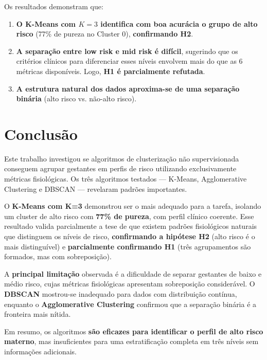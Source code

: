 \documentclass[12pt]{article}
\begin{document}
Os resultados demonstram que:
\begin{enumerate}
    \item \textbf{O K-Means com $K=3$ identifica com boa acurácia o grupo de alto risco} (77\% de pureza no Cluster 0), \textbf{confirmando H2}.
    \item \textbf{A separação entre low risk e mid risk é difícil}, sugerindo que os critérios clínicos para diferenciar esses níveis envolvem mais do que as 6 métricas disponíveis. Logo, \textbf{H1 é parcialmente refutada}.
    \item \textbf{A estrutura natural dos dados aproxima-se de uma separação binária} (alto risco vs. não-alto risco).
\end{enumerate}

\section{Conclusão}

Este trabalho investigou se algoritmos de clusterização não supervisionada conseguem agrupar gestantes em perfis de risco utilizando exclusivamente métricas fisiológicas. Os três algoritmos testados --- K-Means, Agglomerative Clustering e DBSCAN --- revelaram padrões importantes.

O \textbf{K-Means com K=3} demonstrou ser o mais adequado para a tarefa, isolando um cluster de alto risco com \textbf{77\% de pureza}, com perfil clínico coerente. Esse resultado valida parcialmente a tese de que existem padrões fisiológicos naturais que distinguem os níveis de risco, \textbf{confirmando a hipótese H2} (alto risco é o mais distinguível) e \textbf{parcialmente confirmando H1} (três agrupamentos são formados, mas com sobreposição).

A \textbf{principal limitação} observada é a dificuldade de separar gestantes de baixo e médio risco, cujas métricas fisiológicas apresentam sobreposição considerável. O \textbf{DBSCAN} mostrou-se inadequado para dados com distribuição contínua, enquanto o \textbf{Agglomerative Clustering} confirmou que a separação binária é a fronteira mais nítida.

Em resumo, os algoritmos \textbf{são eficazes para identificar o perfil de alto risco materno}, mas insuficientes para uma estratificação completa em três níveis sem informações adicionais.
\end{document}
